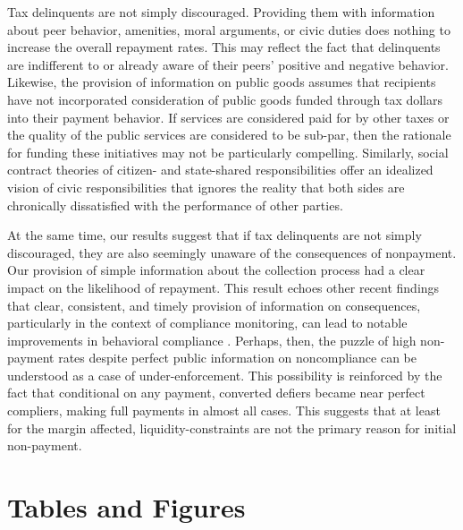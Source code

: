 \documentclass[12pt,titlepage]{article}
\begin{document}
Tax delinquents are not simply discouraged. Providing them with 
information about peer behavior, amenities, moral arguments, or civic 
duties does nothing to increase the overall repayment rates. This may 
reflect the fact that delinquents are indifferent to or already aware 
of their peers’ positive and negative behavior. Likewise, the provision 
of information on public goods assumes that recipients have not 
incorporated consideration of public goods funded through tax dollars 
into their payment behavior. If services are considered paid for by 
other taxes or the quality of the public services are considered to be 
sub-par, then the rationale for funding these initiatives may not be 
particularly compelling.  Similarly, social contract theories of citizen- 
and state-shared responsibilities offer an idealized vision of civic 
responsibilities that ignores the reality that both sides are chronically 
dissatisfied with the performance of other parties.

At the same time, our results suggest that if tax delinquents are not 
simply discouraged, they are also seemingly unaware of the consequences 
of nonpayment. Our provision of simple information about the collection 
process had a clear impact on the likelihood of repayment. This result 
echoes other recent findings that clear, consistent, and timely provision 
of information on consequences, particularly in the context of compliance 
monitoring, can lead to notable improvements in behavioral compliance 
\citep{hawken}. Perhaps, then, the puzzle of high non-payment 
rates despite perfect public information on noncompliance can be understood 
as a case of under-enforcement. This possibility is reinforced by the fact 
that conditional on any payment, converted defiers became near perfect 
compliers, making full payments in almost all cases. This suggests that at 
least for the margin affected, liquidity-constraints are not the primary 
reason for initial non-payment.



\section{Tables and Figures}
\end{document}
